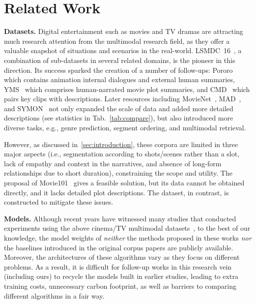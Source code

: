 \section{Related Work}
\label{sec:rw}

\noindent\textbf{Datasets.} Digital entertainment such as movies and TV dramas are attracting much research attention from the multimodal research field, as they offer a valuable snapshot of situations and scenarios in the real-world. 
LSMDC~16~\citep{lsmdc2015cvpr,lsmdc2017ijcv}, a combination of sub-datasets in several related domains, is the pioneer in this direction. 
Its success sparked the creation of a number of follow-ups: Pororo~\cite{pororo2017arxiv} which contains animation internal dialogues and external human summaries, YMS~\citep{yms2018cvpr} which comprises human-narrated movie plot summaries, and CMD~\citep{cmd2020accv} which pairs key clips with descriptions. Later resources including MovieNet~\citep{movienet2020eccv}, MAD~\citep{mad2022cvpr}, and SYMON~\citep{symon2022arxiv} not only expanded the scale of data and added more detailed descriptions (see statistics in Tab.~\ref{tab:compare}), but also introduced more diverse tasks, e.g., genre prediction, segment ordering, and multimodal retrieval. 

However, as discussed in~\cref{sec:introduction}, these corpora are limited in three major aspects (i.e., segmentation according to shots/scenes rather than a slot, lack of empathy and context in the narratives, and absence of long-form relationships due to short duration), constraining the scope and utility. The proposal of Movie101~\citep{yue2023movie101} gives a feasible solution, but its data cannot be obtained directly, and it lacks detailed plot descriptions. The \TVD dataset, in contrast, is constructed to mitigate these issues.

\noindent\textbf{Models.} Although recent years have witnessed many studies that conducted experiments using the above cinema/TV multimodal datasets~\citep{lsmdc2017ijcv,movienet2020eccv,symon2022arxiv,movie22022arxiv,yu2021transitional}, to the best of our knowledge, the model weights of \textit{neither} the methods proposed in these works \textit{nor} the baselines introduced in the original corpus papers are publicly available. Moreover, the architectures of these algorithms vary as they focus on different problems. As a result, it is difficult for follow-up works in this research vein (including ours) to recycle the models built in earlier studies, leading to extra training costs, unnecessary carbon footprint, as well as barriers to comparing different algorithms in a fair way.

